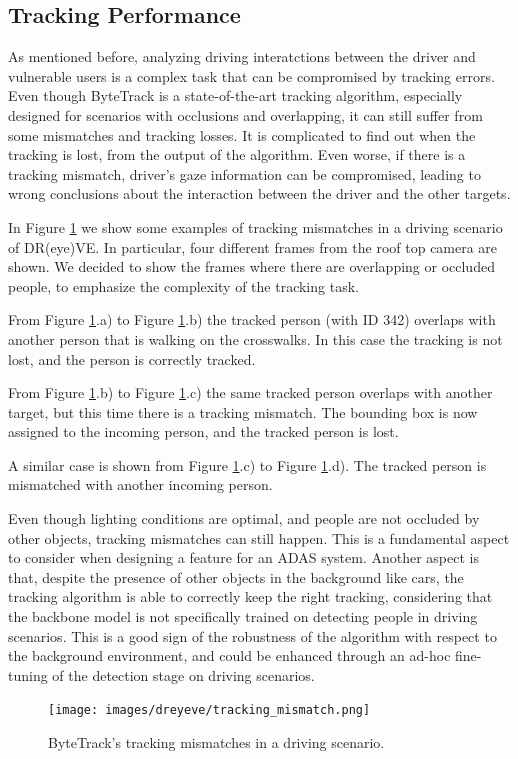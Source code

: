 \subsection{Tracking Performance}
As mentioned before, analyzing driving interatctions between the driver and 
vulnerable users is a complex task that can be compromised by tracking errors.
Even though ByteTrack is a state-of-the-art tracking algorithm, especially 
designed for scenarios with occlusions and overlapping, it can still suffer 
from some mismatches and tracking losses.
It is complicated to find out when the tracking is lost, from the output of 
the algorithm. Even worse, if there is a tracking mismatch, driver's gaze 
information can be compromised, leading to wrong conclusions about the interaction 
between the driver and the other targets.

In Figure \ref{fig:tracking_mismatch} we show some examples of tracking mismatches
in a driving scenario of DR(eye)VE.
In particular, four different frames from the roof top camera are shown. 
We decided to show the frames where there are overlapping or occluded people, 
to emphasize the complexity of the tracking task.

From Figure \ref{fig:tracking_mismatch}.a) to Figure \ref{fig:tracking_mismatch}.b)
the tracked person (with ID 342) overlaps with another person that is walking on 
the crosswalks. In this case the tracking is not lost, and the person is correctly 
tracked.

From Figure \ref{fig:tracking_mismatch}.b) to Figure \ref{fig:tracking_mismatch}.c)
the same tracked person overlaps with another target, but this time there is 
a tracking mismatch. The bounding box is now assigned to the incoming person, 
and the tracked person is lost.

A similar case is shown from Figure \ref{fig:tracking_mismatch}.c) to 
Figure \ref{fig:tracking_mismatch}.d). The tracked person is mismatched with 
another incoming person.

Even though lighting conditions are optimal, and people are not occluded by 
other objects, tracking mismatches can still happen. This is a fundamental 
aspect to consider when designing a feature for an ADAS system. 
Another aspect is that, despite the presence of other objects in the background 
like cars, the tracking algorithm is able to correctly keep the right tracking, 
considering that the backbone model is not specifically trained on detecting 
people in driving scenarios. This is a good sign of the robustness of the 
algorithm with respect to the background environment, and could be enhanced 
through an ad-hoc fine-tuning of the detection stage on driving scenarios.
\begin{figure}
\centering
\texttt{[image: images/dreyeve/tracking\_mismatch.png]}
\vspace{0.4cm}
\caption{ByteTrack's tracking mismatches in a driving scenario.}
\label{fig:tracking_mismatch}
\end{figure}

